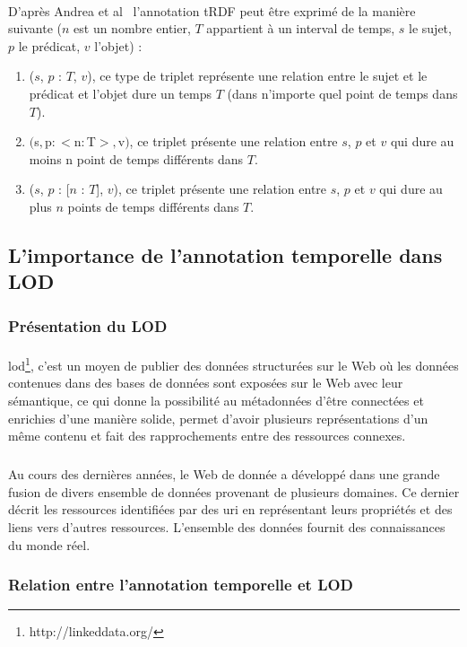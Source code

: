 \documentclass[12pt,a4	]{report}
\begin{document}
\paragraph{}
D'après Andrea et al~\cite{pugliese2008} l’annotation tRDF peut être exprimé de la manière suivante ($n$ est un nombre entier, $T$ appartient à un interval de temps, $s$ le sujet, $p$ le prédicat, $v$ l'objet) :
\begin{enumerate}
\item ($s$, $p$ : {$T$}, $v$), ce type de triplet représente une relation entre le sujet et le prédicat et l'objet dure un temps $T$ (dans n'importe quel point de temps dans $T$).
\item $($s$, $p$ : <$n$ : $T$>, $v$)$, ce triplet présente une relation entre $s$, $p$ et $v$ qui dure au moins n point de temps différents dans $T$.
\item ($s$, $p$ : [$n$ : $T$], $v$), ce triplet présente une relation entre $s$, $p$ et $v$ qui dure au plus $n$ points de temps différents dans $T$.
\end{enumerate}
\subsection*{L'importance de l'annotation temporelle dans LOD}
\subsubsection*{Présentation du LOD}
\paragraph{}
\gls{lod}\footnote{http://linkeddata.org/}, c'est un moyen de publier des données structurées sur le Web où les données contenues dans des bases de données sont exposées sur le Web avec leur sémantique, ce qui donne la possibilité au métadonnées d'être connectées et enrichies d'une manière solide, permet d'avoir plusieurs représentations d'un même contenu et fait des rapprochements entre des ressources connexes.
\subparagraph{}
Au cours des dernières années, le Web de donnée a développé dans une grande fusion de divers ensemble de données provenant de plusieurs domaines. Ce dernier décrit les ressources identifiées par des \gls{uri} en représentant leurs propriétés et des liens vers d’autres ressources. L'ensemble des données fournit des connaissances du monde réel.
\subsubsection*{Relation entre l'annotation temporelle et LOD}
\end{document}
